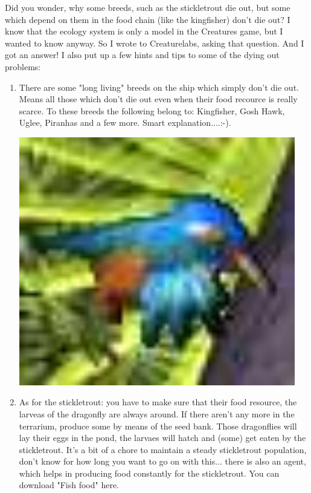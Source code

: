 \documentclass[11pt,twoside,a4paper]{article}
\begin{document}
{\footnotesize 
	Did you wonder, why some breeds, such as the stickletrout die out, but some which depend on them in the food chain (like the kingfisher) don't die out? I know that the ecology system is only a model in the Creatures game, but I wanted to know anyway. So I wrote to Creaturelabs, asking that question. And I got an answer! I also put up a few hints and tips to some of the dying out problems:
	\begin{enumerate}
		\item \begin{minipage}[h]{0.875\textwidth} There are some "long living" breeds on the ship which simply don't die out. Means all those which don't die out even when their food recource is really scarce. To these breeds the following belong to: Kingfisher, Gosh Hawk, Uglee, Piranhas and a few more. Smart explanation....:-). 
			\end{minipage} \hfill \begin{minipage}[ht]{0.10\textwidth} \includegraphics[width=0.95\textwidth]{img/kingfi.jpg} \end{minipage}
		\item \begin{minipage}[h]{0.675\textwidth} As for the stickletrout: you have to make sure that their food resource, the larveas of the dragonfly are always around. If there aren't any more in the terrarium, produce some by means of the seed bank. Those dragonflies will lay their eggs in the pond, the larvaes will hatch and (some) get eaten by the stickletrout. It's a bit of a chore to maintain a steady stickletrout population, don't know for how long you want to go on with this... there is also an agent, which helps in producing food constantly for the stickletrout. You can download "Fish food" here.

\end{minipage}
\end{enumerate}}
\end{document}
